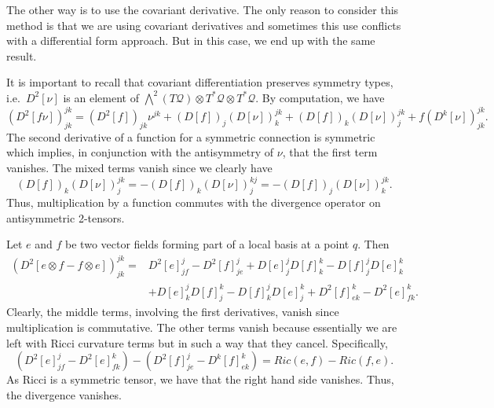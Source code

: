 \documentclass[11pt]{article}
\theoremstyle{remark}
\begin{document}
The other way is to use the covariant derivative. The only reason to
consider this method is that we are using covariant derivatives and
sometimes this use conflicts with a differential form approach. But in
this case, we end up with the same result.


It is important to
recall
 that covariant differentiation preserves symmetry
types, i.e.\ $D^2 [\nu]$ is an element of $\bigwedge^2(\ensuremath{T \ensuremath{\mathcal{Q}}}) \otimes \ensuremath{T^{*} \ensuremath{\mathcal{Q}}}
\otimes \ensuremath{T^{*} \ensuremath{\mathcal{Q}}}$.   
By computation, we have
\[
(D^2[f \nu])_{{\ensuremath{j}}{\ensuremath{k}}}^{{\ensuremath{j}}{\ensuremath{k}}} = (D^2
[f])_{{\ensuremath{j}}{\ensuremath{k}}} \nu^{{\ensuremath{j}}{\ensuremath{k}}} + 
(D[f])_{\ensuremath{j}} (D[\nu])_{\ensuremath{k}}^{{\ensuremath{j}}{\ensuremath{k}}} + (D[f])_{\ensuremath{k}}
(D[\nu])_{\ensuremath{j}}^{{\ensuremath{j}}{\ensuremath{k}}} + f (D^{\ensuremath{k}} 
[\nu])^{{\ensuremath{j}}{\ensuremath{k}}}_{{\ensuremath{j}}{\ensuremath{k}}} .
\]
The second derivative of a function for a symmetric connection is
symmetric which implies, in conjunction with the antisymmetry of
$\nu$,  that the first term vanishes. The mixed terms
vanish since we clearly have 
\[
(D[f])_{\ensuremath{k}} (D[\nu])_{\ensuremath{j}}^{{\ensuremath{j}}{\ensuremath{k}}} = -
(D[f])_{\ensuremath{k}} (D[\nu])_{\ensuremath{j}}^{{\ensuremath{k}}{\ensuremath{j}}} =  
- (D[f])_{\ensuremath{j}} (D[\nu])_{\ensuremath{k}}^{{\ensuremath{j}}{\ensuremath{k}}}.\]
 Thus,  multiplication by a function commutes with the
divergence operator on antisymmetric 2-tensors.

Let $e$ and $f$ be two vector fields forming part of a local
basis at a point \ensuremath{q}. Then 
\[
\begin{split}
(D^2 [e \otimes f - f \otimes e])_{{\ensuremath{j}}{\ensuremath{k}}}^{{\ensuremath{j}}{\ensuremath{k}}}  =  &
D^2[e]_{{\ensuremath{j}}f}^{\ensuremath{j}} - D^2[f]_{{\ensuremath{j}}e}^{\ensuremath{j}}  
+ 
D[e]_{\ensuremath{j}}^{\ensuremath{j}}  D[f]_{\ensuremath{k}}^{\ensuremath{k}} -
D[f]_{\ensuremath{j}}^{\ensuremath{j}}  D[e]_{\ensuremath{k}}^{\ensuremath{k}} 
\\ &+ 
D[e]_{\ensuremath{k}}^{\ensuremath{j}}  D[f]_{\ensuremath{j}}^{\ensuremath{k}} -
D[f]_{\ensuremath{k}}^{\ensuremath{j}}  D[e]_{\ensuremath{j}}^{\ensuremath{k}} 
+
D^2[f]_{e{\ensuremath{k}}}^{\ensuremath{k}} - D^2[e]_{f{\ensuremath{k}}}^{\ensuremath{k}} .
\end{split}
\]
Clearly, the middle terms, involving the first derivatives, 
vanish since multiplication is commutative. 
The other terms vanish because essentially we are left with  Ricci
curvature terms but in such a way that they cancel. Specifically, 
\[
(D^2[e]_{{\ensuremath{j}}f}^{\ensuremath{j}} - D^2[e]_{f{\ensuremath{k}}}^{\ensuremath{k}}) 
-
( D^2[f]_{{\ensuremath{j}}e}^{\ensuremath{j}}  - D^{\ensuremath{k}}[f]_{e{\ensuremath{k}}}^{\ensuremath{k}})
= 
Ric(e,f) - Ric(f,e).
\]
As Ricci is a symmetric tensor, we have that the right hand side
vanishes. Thus, the divergence vanishes. 
\end{document}
